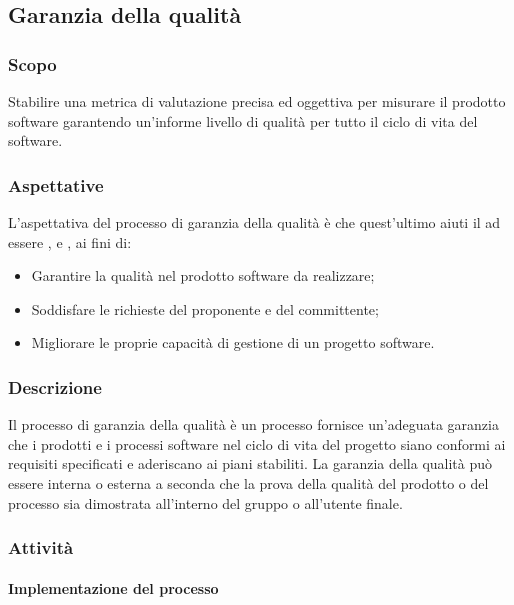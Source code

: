 \subsection{Garanzia della qualità}
\subsubsection{Scopo}
Stabilire una metrica di valutazione precisa ed oggettiva per misurare il prodotto software garantendo un'informe livello di qualità per tutto il ciclo di vita del software.
\subsubsection{Aspettative}
L'aspettativa del processo di garanzia della qualità è che quest'ultimo aiuti il \Gruppo{} ad essere ,  e , ai fini di:
\begin{itemize}
    \item Garantire la qualità nel prodotto software da realizzare;
    \item Soddisfare le richieste del proponente e del committente;
    \item Migliorare le proprie capacità di gestione di un progetto software.
\end{itemize}
\subsubsection{Descrizione}
Il processo di garanzia della qualità è un processo fornisce un'adeguata garanzia che i prodotti e i processi software nel ciclo di vita del progetto siano conformi ai requisiti specificati e aderiscano ai piani stabiliti. La garanzia della qualità può essere interna o esterna a seconda che la prova della qualità del prodotto o del processo sia dimostrata all'interno del gruppo o all'utente finale.
\subsubsection{Attività}
\paragraph{Implementazione del processo}


